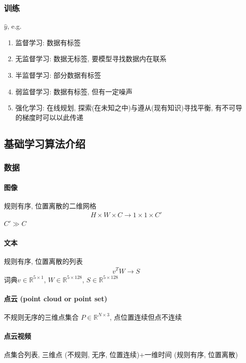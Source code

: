 \subsubsection{训练}
$\hat{y}$, e.g.
\begin{enumerate}
    \item 监督学习: 数据有标签
    \item 无监督学习: 数据无标签, 要模型寻找数据内在联系
    \item 半监督学习: 部分数据有标签
    \item 弱监督学习: 数据有标签, 但有一定噪声
    \item 强化学习: 在线规划, 探索(在未知之中)与遵从(现有知识)寻找平衡, 有不可导的梯度时可以以此传递
\end{enumerate}



\subsection{基础学习算法介绍}
\subsubsection{数据}
\paragraph{图像}
规则有序, 位置离散的二维网格
\begin{align*}
    H\times W\times C \rightarrow 1\times 1\times C'
\end{align*}
$C' \gg C$

\paragraph{文本}
规则有序, 位置离散的列表
\begin{align*}
    v^T W \rightarrow S
\end{align*}
词典$v\in \mathbb{R}^{5\times 1}$, $W\in \mathbb{R}^{5\times 128}$, $S \in \mathbb{R}^{5\times 128}$

\paragraph{点云 (point cloud or point set)}
不规则无序的三维点集合 $P \in \mathbb{R}^{N\times 3}$, 点位置连续但点不连续

\paragraph{点云视频}
点集合列表, 三维点 (不规则, 无序, 位置连续)+一维时间 (规则有序, 位置离散)

